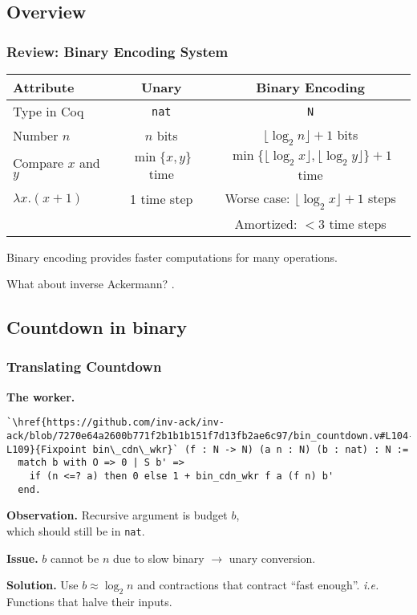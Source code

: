 
\subsection{Overview}

\begin{frame}
\frametitle{Review: Binary Encoding System}

\begin{tabular}{l|c|c}
	Attribute & Unary & Binary Encoding \\ \hline
	Type in Coq & \texttt{nat} & \texttt{N} \\[7pt]
	Number $n$ & $n$ bits & $\lfloor \log_2n \rfloor + 1$ bits \\[7pt]
	Compare $x$ and $y$ & $\min\{x, y\}$ time & $\min\{\lfloor \log_2x \rfloor, \lfloor \log_2y \rfloor\} + 1$ time \\[9pt]
	$\lambda x. (x + 1)$ & 1 time step & Worse case: $\lfloor \log_2x \rfloor + 1$ steps \\
	                     &             & Amortized: $< 3$ time steps \\
	                    
\end{tabular}

\bigskip

Binary encoding provides faster computations for many operations.

\smallskip

\pause 
What about inverse Ackermann? .

\end{frame}


\subsection{Countdown in binary}


\begin{frame}[fragile]
\frametitle{Translating Countdown}

\textbf{The worker.}
\begin{lstlisting}
`\href{https://github.com/inv-ack/inv-ack/blob/7270e64a2600b771f2b1b1b151f7d13fb2ae6c97/bin_countdown.v#L104-L109}{Fixpoint bin\_cdn\_wkr}` (f : N -> N) (a n : N) (b : nat) : N :=
  match b with O => 0 | S b' =>
    if (n <=? a) then 0 else 1 + bin_cdn_wkr f a (f n) b'
  end.
\end{lstlisting}

\smallskip

\pause 
\textbf{Observation.} Recursive argument is budget $b$, \\which should still be in \texttt{nat}.

\bigskip

\textbf{Issue.} $b$ cannot be $n$ due to slow binary $\rightarrow$ unary conversion.

\bigskip

\pause 
\textbf{Solution.} Use $b \approx \log_2n$ and contractions that contract ``fast enough''. 
\emph{i.e.} Functions that halve their inputs.
\end{frame}



